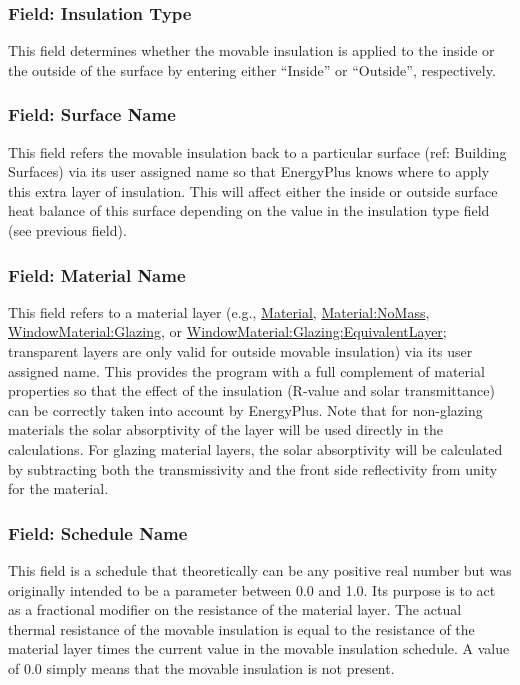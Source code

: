 \subsubsection{Field: Insulation Type}\label{field-insulation-type}

This field determines whether the movable insulation is applied to the inside or the outside of the surface by entering either ``Inside'' or ``Outside'', respectively.

\subsubsection{Field: Surface Name}\label{field-surface-name-1}

This field refers the movable insulation back to a particular surface (ref: Building Surfaces) via its user assigned name so that EnergyPlus knows where to apply this extra layer of insulation. This will affect either the inside or outside surface heat balance of this surface depending on the value in the insulation type field (see previous field).

\subsubsection{Field: Material Name}\label{field-material-name}

This field refers to a material layer (e.g., \hyperref[material]{Material}, \hyperref[materialnomass]{Material:NoMass}, \hyperref[windowmaterialglazing]{WindowMaterial:Glazing}, or \hyperref[windowmaterialglazingequivalentlayer]{WindowMaterial:Glazing:EquivalentLayer}; transparent layers are only valid for outside movable insulation) via its user assigned name. This provides the program with a full complement of material properties so that the effect of the insulation (R-value and solar transmittance) can be correctly taken into account by EnergyPlus.  Note that for non-glazing materials the solar absorptivity of the layer will be used directly in the calculations.  For glazing material layers, the solar absorptivity will be calculated by subtracting both the transmissivity and the front side reflectivity from unity for the material.

\subsubsection{Field: Schedule Name}\label{field-schedule-name}

This field is a schedule that theoretically can be any positive real number but was originally intended to be a parameter between 0.0 and 1.0. Its purpose is to act as a fractional modifier on the resistance of the material layer. The actual thermal resistance of the movable insulation is equal to the resistance of the material layer times the current value in the movable insulation schedule. A value of 0.0 simply means that the movable insulation is not present.

